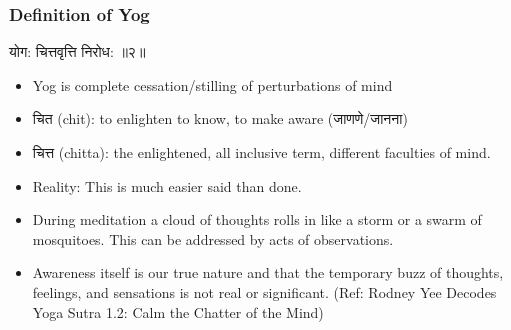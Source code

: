 \begin{frame}[fragile]\frametitle{Definition of Yog}

\begin{sanskrit}
योग: चित्तवृत्ति निरोध:  ॥२॥
\end{sanskrit}

	\begin{itemize}
	\item Yog is complete cessation/stilling of perturbations of mind
	\item चित (chit): to enlighten to know, to make aware (जाणणे/जानना)
	\item चित्त (chitta): the enlightened, all inclusive term, different faculties of mind.
	\item Reality: This is much easier said than done. 
	\item During meditation a cloud of thoughts rolls in like a storm or a swarm of mosquitoes. This can be addressed by acts of observations. \item Awareness itself is our true nature and that the temporary buzz of thoughts, feelings, and sensations is not real or significant. ({\tiny Ref: Rodney Yee Decodes Yoga Sutra 1.2: Calm the Chatter of the Mind})
	\end{itemize}

\end{frame}


